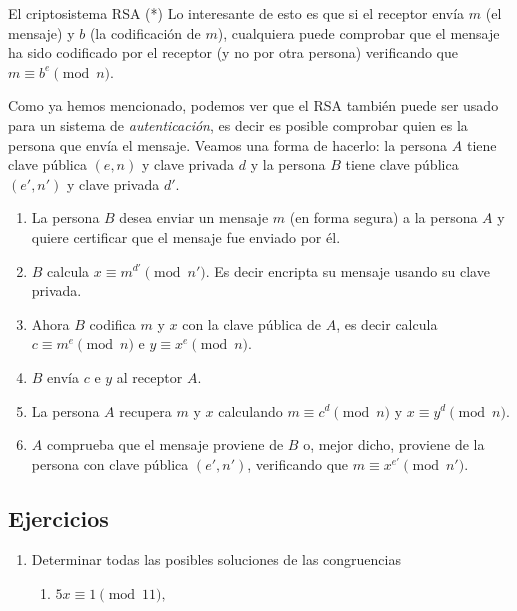 \begin{section}{El criptosistema RSA (*)}
Lo interesante de esto es que si el receptor envía $m$ (el mensaje) y $b$ (la codificación de $m$), cualquiera puede comprobar que el mensaje ha sido codificado por el receptor (y no por otra persona) verificando  que   $m \equiv b^e \pmod{n}$.     


\begin{ejemplo*}
Como ya hemos mencionado, podemos ver que el RSA también puede ser usado para un sistema de \emph{autenticación}, es decir es posible comprobar quien es la persona que envía el mensaje. Veamos una forma de hacerlo: la persona $A$ tiene clave pública $(e,n)$ y clave privada $d$ y   la persona $B$  tiene clave pública $(e',n')$ y clave privada $d'$. 

\begin{enumerate}[label=\textit{\alph*)}]
    \item  La persona $B$ desea enviar un mensaje $m$ (en forma segura) a la persona $A$ y quiere certificar que el mensaje fue enviado por él.
    \item  $B$ calcula $x \equiv m^{d'} \pmod{n'}$. Es decir encripta su mensaje usando su  clave privada.
    \item  Ahora $B$ codifica $m$ y $x$ con la clave pública de $A$, es decir calcula $c \equiv m^{e} \pmod{n}$ e  $y \equiv x^e \pmod{n}$. 
    \item  $B$ envía $c$ e $y$ al receptor $A$.
    \item  La persona $A$ recupera $m$ y $x$ calculando  $m \equiv c^d \pmod{n}$ y  $x \equiv y^d \pmod{n}$.
    \item  $A$ comprueba que el mensaje  proviene de $B$ o, mejor dicho, proviene de la persona con clave pública $(e',n')$, verificando que $m \equiv x^{e'} \pmod{n'}$. 
\end{enumerate}



\end{ejemplo*}
\section{Ejercicios}
\begin{enumerate}
\item Determinar todas las posibles soluciones de las congruencias
\begin{enumerate}
    \item  $5x\equiv1 \pmod{11},$
    

\end{enumerate}
\end{enumerate}
\end{section}
